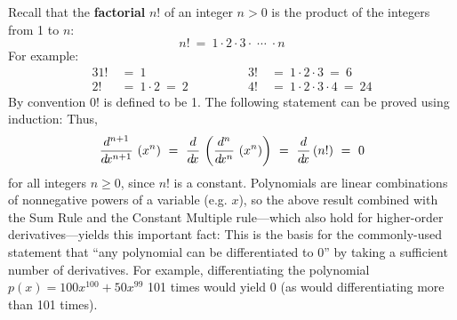 Recall that the \textbf{factorial} $n!$ of an integer $n > 0$
is the product of the integers from 1 to $n$:
\begin{displaymath}
 n! ~=~ 1 \cdot 2 \cdot 3 \cdot \;\cdots\; \cdot n
\end{displaymath}
For example:
\begin{alignat*}{3}
 1! ~&=~ 1 \qquad\qquad& 3! ~&=~ 1 \cdot 2 \cdot 3 ~=~ 6\\
 2! ~&=~ 1 \cdot 2 ~=~ 2 \qquad\qquad& 4! ~&=~ 1 \cdot 2 \cdot 3 \cdot 4 ~=~ 24
\end{alignat*}
By convention $0!$ is defined to be 1. The following statement can be proved
using induction:
Thus,
\begin{displaymath}
 \dfrac{d^{n+1}}{d\!x^{n+1}}\,\left(x^n\right) ~=~
 \frac{d}{d\!x}\,\left(\dfrac{d^n}{d\!x^n}\,\left(x^n\right)\right) ~=~
 \frac{d}{d\!x}\,(n!) ~=~ 0
\end{displaymath}
for all integers $n \ge 0$, since $n!$ is a constant. Polynomials are linear
combinations of nonnegative powers of a variable (e.g. $x$), so the above
result combined with the Sum Rule and the Constant Multiple rule---which
also hold for higher-order derivatives---yields this important fact:
This is the basis for the commonly-used statement that ``any polynomial
can be differentiated to 0'' by taking a sufficient number of derivatives. For
example, differentiating the polynomial $p(x) = 100x^{100} + 50x^{99}$ 101 times
would yield 0 (as would differentiating more than 101 times).\vspace{3mm}

